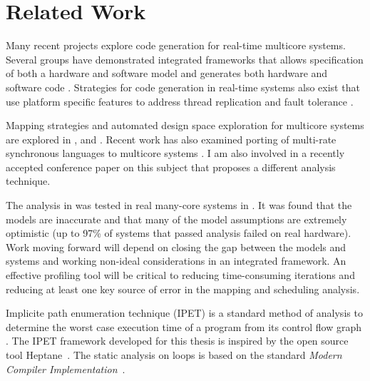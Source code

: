 
\chapter{Related Work} %

\label{c:related} %



Many recent projects explore code generation for real-time multicore systems. Several groups have demonstrated integrated frameworks that allows specification of both a hardware and software model and generates both hardware and software code \cite{goossens2013compsoc,gauthier2001automatic}. Strategies for code generation in real-time systems also exist that use platform specific features to address thread replication and fault tolerance \cite{huang2012framework}.

Mapping strategies and automated design space exploration for multicore systems are explored in \cite{bolchini2013reliability}, and \cite{kang2014static}. Recent work has also examined porting of multi-rate synchronous languages to multicore systems \cite{puffitsch2013mapping}. I am also involved in a recently accepted conference paper on this subject that proposes a different analysis technique.

The analysis in \cite{kang2014static} was tested in real many-core systems in \cite{sigrist2015mixed}. It was found that the models are inaccurate and that many of the model assumptions are extremely optimistic (up to 97\% of systems that passed analysis failed on real hardware). Work moving forward will depend on closing the gap between the models and systems and working non-ideal considerations in an integrated framework. An effective profiling tool will be critical to reducing time-consuming iterations and reducing at least one key source of error in the mapping and scheduling analysis.

Implicite path enumeration technique (IPET) is a standard method of analysis to determine the worst case execution time of a program from its control flow graph \cite{li1995performance}. The IPET framework developed for this thesis is inspired by the open source tool Heptane~\cite{heptane}. The static analysis on loops is based on the standard \emph{Modern Compiler Implementation}~\cite{andrew2002modern}.


